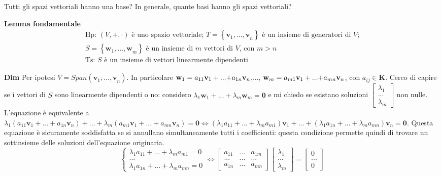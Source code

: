 \documentclass{article}
\begin{document}
Tutti gli spazi vettoriali hanno una base? In generale, quante basi hanno
gli spazi vettoriali?

\textbf{Lemma fondamentale}%
\begin{gather*}
\text{Hp}\text{: }\left( V,+,\cdot \right) \text{ \`{e} uno spazio
vettoriale; }T=\left\{ \mathbf{v}_{1}\mathbf{,...,v}_{n}\right\} \text{ \`{e}
un insieme di generatori di }V\text{;} \\
S=\left\{ \mathbf{w}_{1}\mathbf{,...,w}_{m}\right\} \text{ \`{e} un insieme
di }m\text{ vettori di }V\text{, con }m>n \\
\text{Ts}\text{: }S\text{ \`{e} un insieme di vettori linearmente dipendenti}
\end{gather*}

\textbf{Dim} Per ipotesi $V=Span\left( \mathbf{v}_{1}\mathbf{,...,v}%
_{n}\right) $. In particolare $\mathbf{w}_{1}=a_{11}\mathbf{v}_{1}+\mathbf{%
...+}a_{1n}\mathbf{v}_{n}$,..., $\mathbf{w}_{m}=a_{m1}\mathbf{v}_{1}+\mathbf{%
...+}a_{mn}\mathbf{v}_{n}$, con $a_{ij}\in \mathbf{K}$. Cerco di capire se i
vettori di $S$ sono linearmente dipendenti o no: considero $\lambda _{1}%
\mathbf{w}_{1}+\mathbf{...+}\lambda _{m}\mathbf{w}_{m}=\mathbf{0}$ e mi
chiedo se esistano soluzioni $\left[ 
\begin{array}{c}
\lambda _{1} \\ 
... \\ 
\lambda _{m}%
\end{array}%
\right] $ non nulle. L'equazione \`{e} equivalente a $\lambda _{1}\left(
a_{11}\mathbf{v}_{1}+\mathbf{...+}a_{1n}\mathbf{v}_{n}\right) +...+\lambda
_{m}\left( a_{m1}\mathbf{v}_{1}+\mathbf{...+}a_{mn}\mathbf{v}_{n}\right) =%
\mathbf{0}\Longleftrightarrow \left( \lambda _{1}a_{11}+...+\lambda
_{m}a_{m1}\right) \mathbf{v}_{1}+\mathbf{...+}\left( \lambda
_{1}a_{1n}+...+\lambda _{m}a_{mn}\right) \mathbf{v}_{n}=\mathbf{0}$. Questa
equazione \`{e} sicuramente soddisfatta se si annullano simultaneamente
tutti i coefficienti: questa condizione permette quindi di trovare un
sottinsieme delle soluzioni dell'equazione originaria.%
\begin{equation*}
\left\{ 
\begin{array}{c}
\lambda _{1}a_{11}+...+\lambda _{m}a_{m1}=0 \\ 
... \\ 
\lambda _{1}a_{1n}+...+\lambda _{m}a_{mn}=0%
\end{array}%
\right. \Longleftrightarrow \left[ 
\begin{array}{ccc}
a_{11} & ... & a_{1m} \\ 
... & ... & ... \\ 
a_{1n} & ... & a_{mn}%
\end{array}%
\right] \left[ 
\begin{array}{c}
\lambda _{1} \\ 
... \\ 
\lambda _{m}%
\end{array}%
\right] =\left[ 
\begin{array}{c}
0 \\ 
... \\ 
0%
\end{array}%
\right]
\end{equation*}
\end{document}
